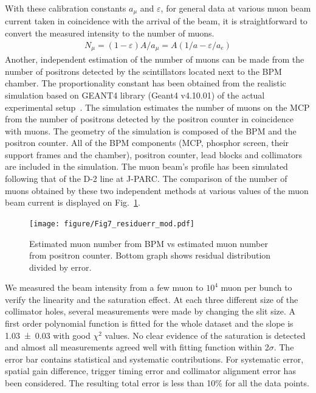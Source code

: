 \documentclass[preprint,3p,twocolumn]{elsarticle}
\begin{document}
With these calibration constants $a_\mu$ and $\varepsilon$, for general data at various muon beam current taken in coincidence with the arrival of the beam, it is straightforward to convert the measured intensity to the number of muons.
{\fontsize{9pt}{0}
	\setlength{\mathindent}{0pt}
	\setlength{\abovedisplayskip}{5pt}
	\setlength{\belowdisplayskip}{5pt}
	\begin{equation}
	\begin{split}
	N_{\mu}=(1-\varepsilon)A/a_\mu=A(1/a-\varepsilon/a_e)
	\end{split}
	\end{equation}
}
\indent
Another, independent estimation of the number of muons can be made from the number of positrons detected by the scintillators located next to the BPM chamber. The proportionality constant has been obtained from the realistic simulation based on GEANT4 library (Geant4 v4.10.01) of the actual experimental setup~\cite{geant4}. 
The simulation estimates the number of muons on the MCP from the number of positrons detected by the positron counter in coincidence with muons. 
The geometry of the simulation is composed of the BPM and the positron counter. 
All of the BPM components (MCP, phosphor screen, their support frames and the chamber), positron counter, lead blocks and collimators are included in the simulation. The muon beam's profile has been simulated following that of the D-2 line at J-PARC. The comparison of the number of muons obtained by these two independent methods at various values of the muon beam current is displayed on Fig.~\ref{fig:muvsmu}. 

\begin{figure}[htb]
	\vspace{-0.15cm}
	\begin{minipage}[t]{60mm}
		\texttt{[image: figure/Fig7\_residuerr\_mod.pdf]}
	\end{minipage}
	\caption{Estimated muon number from BPM vs estimated muon number from positron counter.
	Bottom graph shows residual distribution divided by error.}
\vspace{-0.2cm}
	\label{fig:muvsmu}
\end{figure}
We measured the beam intensity from a few muon to $10^{4}$ muon per bunch to verify the linearity and the saturation effect. At each three different size of the collimator holes, several measurements were made by changing the slit size.
A first order polynomial function is fitted for the whole dataset and the slope is \num{1.03\pm 0.03} with good $\chi^{2}$ values.
No clear evidence of the saturation is detected and almost all measurements agreed well with fitting function within 2$\sigma$.
The error bar contains statistical and systematic contributions.
For systematic error, spatial gain difference, trigger timing error and collimator alignment error has been considered. The resulting total error is less than 10\% for all the data points.
 
\end{document}
